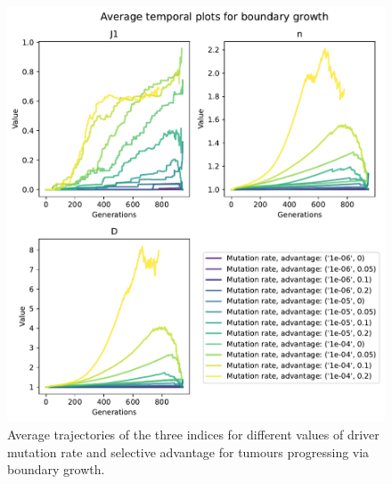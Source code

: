 \begin{figure} \centering
    \includegraphics[width=\textwidth]{Chapter_3/figures/boundary-temporal.pdf}
    \caption{Average trajectories of the three indices for different values of
    driver mutation rate and selective advantage for tumours progressing via
    boundary growth.}
    \label{fig:boundary-temporal}
\end{figure}
